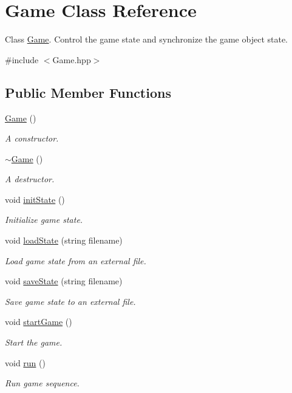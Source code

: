\hypertarget{class_game}{}\section{Game Class Reference}
\label{class_game}


Class \mbox{\hyperlink{class_game}{Game}}. Control the game state and synchronize the game object state.  




{\ttfamily \#include $<$Game.\+hpp$>$}

\subsection*{Public Member Functions}
\begin{DoxyCompactItemize}
\item 
\mbox{\hyperlink{class_game_ad59df6562a58a614fda24622d3715b65}{Game}} ()
\begin{DoxyCompactList}\small\item\em A constructor. \end{DoxyCompactList}\item 
\mbox{\hyperlink{class_game_ae3d112ca6e0e55150d2fdbc704474530}{$\sim$\+Game}} ()
\begin{DoxyCompactList}\small\item\em A destructor. \end{DoxyCompactList}\item 
void \mbox{\hyperlink{class_game_a741532226fb50fd8113b0e2a0f162858}{init\+State}} ()
\begin{DoxyCompactList}\small\item\em Initialize game state. \end{DoxyCompactList}\item 
void \mbox{\hyperlink{class_game_a89e4124211cd2158244b9860b46c4767}{load\+State}} (string filename)
\begin{DoxyCompactList}\small\item\em Load game state from an external file. \end{DoxyCompactList}\item 
void \mbox{\hyperlink{class_game_a1d537d2349fb33959018a02eccea1c79}{save\+State}} (string filename)
\begin{DoxyCompactList}\small\item\em Save game state to an external file. \end{DoxyCompactList}\item 
void \mbox{\hyperlink{class_game_ae8638ccdb0ef3bf39a6affa30aa1258f}{start\+Game}} ()
\begin{DoxyCompactList}\small\item\em Start the game. \end{DoxyCompactList}\item 
void \mbox{\hyperlink{class_game_a1ab78f5ed0d5ea879157357cf2fb2afa}{run}} ()
\begin{DoxyCompactList}\small\item\em Run game sequence. \end{DoxyCompactList}\end{DoxyCompactItemize}


